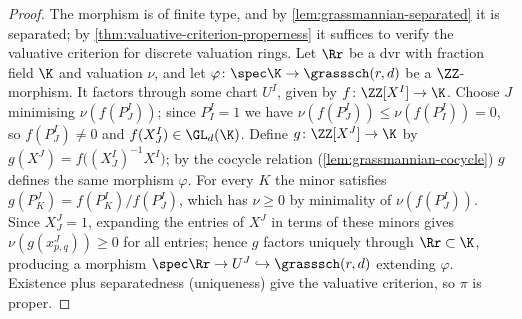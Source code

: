 \begin{proof}
  The morphism is of finite type, and by \cref{lem:grassmannian-separated} it is
  separated; by \cref{thm:valuative-criterion-properness} it suffices to verify
  the valuative criterion for discrete valuation rings. Let $\Rr$ be a dvr with
  fraction field $\K$ and valuation $\nu$, and let $\varphi\colon\spec\K\to
  \grasssch(r,d)$ be a $\ZZ$-morphism. It factors through some chart $U^I$, given
  by $f\colon\ZZ[X^I]\to\K$. Choose $J$ minimising $\nu(f(P^I_J))$; since
  $P^I_I = 1$ we have $\nu(f(P^I_J))\le\nu(f(P^I_I)) = 0$, so $f(P^I_J)\ne 0$ and
  $f(X^I_J)\in\GL_d(\K)$. Define $g\colon\ZZ[X^J]\to\K$ by
  $g(X^J) = f\big((X^I_J)^{-1}X^I\big)$; by the cocycle relation
  (\cref{lem:grassmannian-cocycle}) $g$ defines the same morphism $\varphi$. For
  every $K$ the minor satisfies $g(P^J_K) = f(P^I_K)/f(P^I_J)$, which has
  $\nu\ge 0$ by minimality of $\nu(f(P^I_J))$. Since $X^J_J = 1$, expanding the
  entries of $X^J$ in terms of these minors gives $\nu(g(x^J_{p,q}))\ge 0$ for
  all entries; hence $g$ factors uniquely through $\Rr\subset\K$, producing a
  morphism $\spec\Rr\to U^J\hookrightarrow\grasssch(r,d)$ extending $\varphi$.
  Existence plus separatedness (uniqueness) give the valuative criterion, so
  $\pi$ is proper.
\end{proof}

